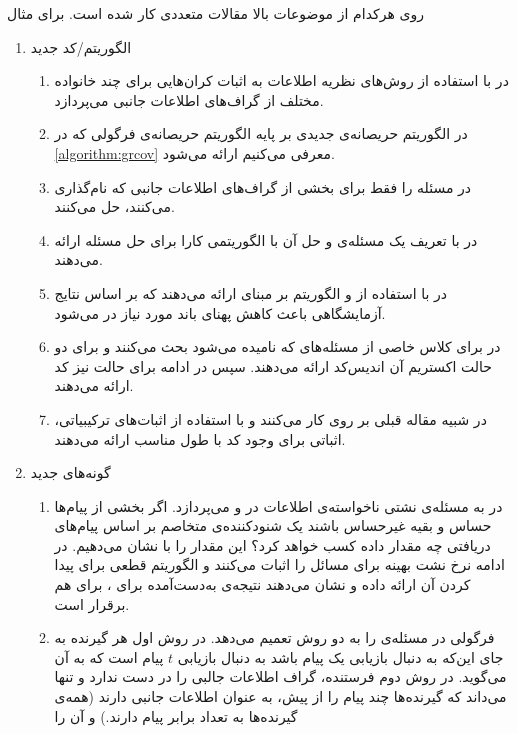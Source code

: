  روی هرکدام از موضوعات بالا مقالات متعددی کار شده است. برای مثال
 \begin{enumerate}
 	\item الگوریتم‌/کد جدید
 	\begin{enumerate}
 		\item 
 		 در
 		\cite{8278015}
 		با استفاده از روش‌های نظریه اطلاعات به اثبات کران‌هایی برای چند خانواده مختلف از گراف‌های اطلاعات جانبی می‌پردازد.
 		\item 
 		در
 		\cite{10313405}
 		الگوریتم حریصانه‌ی جدیدی بر پایه الگوریتم حریصانه‌ی فرگولی که در
   \autoref{algorithm:grcov}
   معرفی می‌کنیم ارائه می‌شود.
 		\item
 		در
 		\cite{8871209}
 		مسئله را فقط برای بخشی از گراف‌های اطلاعات جانبی که
 		نام‌گذاری می‌کنند، حل می‌کنند.
 		\item
 		در
 		\cite{9759449}
 		با تعریف یک مسئله‌ی
 		و حل آن با 
 		الگوریتمی کارا برای حل مسئله ارائه می‌دهند.
 		\item
 		در
 		\cite{8682270}
 		با استفاده از
 		\picod
 		و الگوریتم بر مبنای
 		ارائه می‌دهند که بر اساس نتایج آزمایشگاهی باعث کاهش پهنای باند مورد نیاز در
 		می‌شود.
 		\item
 		در
 		\cite{sasi2019pliable}
 		برای کلاس خاصی از مسئله‌‌های
 		\picod
 		که
 		نامیده می‌شود بحث می‌کنند و برای دو حالت اکستریم آن اندیس‌کد ارائه می‌دهند. سپس در ادامه برای حالت
 		نیز کد ارائه می‌دهند.
 		\item 
 		در
 		\cite{8613483}
 		شبیه مقاله قبلی بر روی
 		کار می‌کنند و با استفاده از اثبات‌های ترکیبیاتی، اثباتی برای وجود کد با طول مناسب ارائه می‌دهند.
 	\end{enumerate}
 	\item گونه‌های جدید
 	\begin{enumerate}
 		\item
 		 در
 		\cite{10015670}
 		به مسئله‌ی نشتی ناخواسته‌ی اطلاعات در
 		\icod
 		و
 		\picod
 		می‌پردازد. اگر بخشی از پیام‌ها حساس و بقیه غیرحساس باشند یک شنودکننده‌ی متخاصم بر اساس پیام‌های دریافتی چه مقدار داده کسب خواهد کرد؟ این مقدار را با
 		نشان می‌دهیم. در ادامه نرخ نشت بهینه برای مسائل
 		\icod
 	را اثبات می‌کنند و الگوریتم قطعی برای پیدا کردن آن ارائه داده و نشان می‌دهند نتیجه‌ی به‌دست‌آمده برای
 		\icod،
 		برای
 		\picod
 		هم برقرار است.
 		\item 
 		فرگولی در
 		\cite{6620405}
 		مسئله‌ی
 		\picod
 		را به دو روش تعمیم می‌دهد. در روش اول هر گیرنده به جای این‌که به دنبال بازیابی یک پیام باشد به دنبال بازیابی
 		$t$
 		پیام است که به آن
 		می‌گوید.
 		در روش دوم فرستنده، گراف اطلاعات جالبی را در دست ندارد و تنها می‌داند که گیرنده‌ها چند پیام را از پیش، به عنوان اطلاعات جانبی دارند (همه‌ی گیرنده‌ها به تعداد برابر پیام دارند.) و آن را
 		

\end{enumerate}
\end{enumerate}
